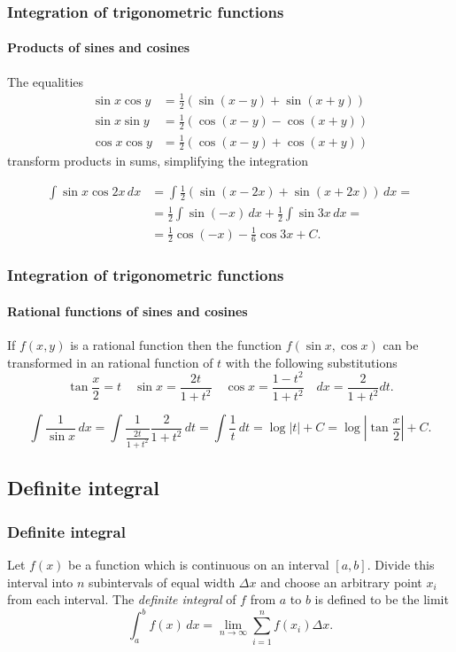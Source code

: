\begin{frame}
\frametitle{Integration of trigonometric functions}
\framesubtitle{Products of sines and cosines}
The equalities 
\begin{align*}
\sin x\cos y &= \frac{1}{2}(\sin(x-y)+\sin(x+y))\\
\sin x\sin y &= \frac{1}{2}(\cos(x-y)-\cos(x+y))\\
\cos x\cos y &= \frac{1}{2}(\cos(x-y)+\cos(x+y))
\end{align*}
transform products in sums, simplifying the integration 

\begin{align*}
\int \sin x\cos 2x\, dx &= \int \frac{1}{2}(\sin(x-2x)+\sin(x+2x))\,dx = \\
&= \frac{1}{2}\int \sin (-x)\,dx +\frac{1}{2}\int \sin 3x\,dx = \\
&= \frac{1}{2}\cos(-x)- \frac{1}{6}\cos 3x +C.
\end{align*}
\end{frame}


\begin{frame}
\frametitle{Integration of trigonometric functions}
\framesubtitle{Rational functions of sines and cosines}
If $f(x,y)$ is a rational function then the function $f(\sin x,\cos x)$ can be transformed in an rational function of  
$t$ with the following substitutions
\[
\tan \frac{x}{2}=t \quad \sin x=\frac{2t}{1+t^2} \quad \cos x = \frac{1-t^2}{1+t^2} \quad dx = \frac{2}{1+t^2}dt. 
\]

\[
\int \frac{1}{\sin x}\,dx = \int \frac{1}{\frac{2t}{1+t^2}}\frac{2}{1+t^2}\,dt = \int \frac{1}{t}\,dt = \log|t|+C =
\log|\tan\frac{x}{2}|+C.
\]
\end{frame}



\subsection{Definite integral}
\begin{frame}
\frametitle{Definite integral}
\begin{definition}
Let $f(x)$ be a function which is continuous on an interval $[a, b]$.
Divide this interval into $n$ subintervals of equal width $\Delta x$ and choose an arbitrary point $x_i$ from each interval.
The \emph{definite integral} of $f$ from $a$ to $b$ is defined to be the limit
\[
\int_a^b f(x)\,dx = \lim_{n\rightarrow \infty}\sum_{i=1}^n f(x_i)\Delta x. 
\]
\end{definition}

\begin{center}
\end{center}
\end{frame}


